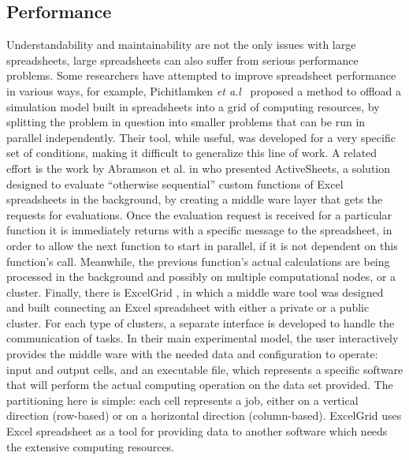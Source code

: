 \documentclass[conference]{IEEEtran}
\begin{document}

\subsection{Performance}
Understandability and maintainability are not the only issues with large spreadsheets, large spreadsheets can also suffer from serious performance problems. Some researchers have attempted to improve spreadsheet performance in various ways, for example, Pichitlamken \emph{et a.l}~\cite{7_pichitlamken_kajkamhaeng_uthayopas_kaewpuang_2010} proposed a method to offload a simulation model built in spreadsheets into a grid of computing resources, by splitting the problem in question into smaller problems that can be run in parallel independently. Their tool, while useful, was developed for a very specific set of conditions, making it difficult to generalize this line of work. A related effort is the work by Abramson et al. in \cite{6_abramson_roe_kotler_mather_2001} who presented ActiveSheets, a solution designed to evaluate ``otherwise sequential'' custom functions of Excel spreadsheets in the background, by creating a middle ware layer that gets the requests for evaluations. Once the evaluation request is received for a particular function it is immediately returns with a specific message to the spreadsheet, in order to allow the next function to start in parallel, if it is not dependent on this function's call. Meanwhile, the previous function's actual calculations are being processed in the background and possibly on multiple computational nodes, or a cluster. Finally, there is ExcelGrid \cite{10_nadiminti_chiu_teoh_luther_venugopal_buyya_2004}, in which a middle ware tool was designed and built connecting an Excel spreadsheet with either a private or a public cluster. For each type of clusters, a separate interface is developed to handle the communication of tasks. In their main experimental model, the user interactively provides the middle ware with the needed data and configuration to operate: input and output cells, and an executable file, which represents a specific software that will perform the actual computing operation on the data set provided. The partitioning here is simple: each cell represents a job, either on a vertical direction (row-based) or on a horizontal direction (column-based). ExcelGrid uses Excel spreadsheet as a tool for providing data to another software which needs the extensive computing resources. 
\end{document}
